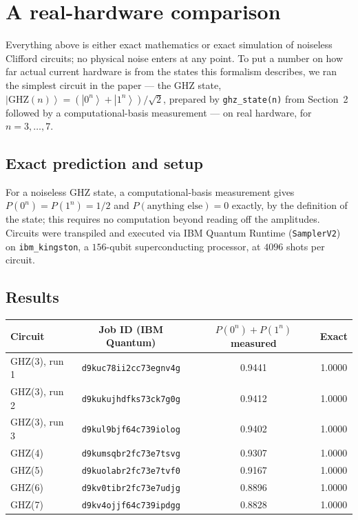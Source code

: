 \documentclass[11pt]{article}
\newcommand{\ket}[1]{\left|#1\right\rangle}
\begin{document}
\section{A real-hardware comparison}\label{sec:hardware}

Everything above is either exact mathematics or exact simulation of
noiseless Clifford circuits; no physical noise enters at any point. To
put a number on how far actual current hardware is from the states this
formalism describes, we ran the simplest circuit in the paper --- the
GHZ state, $\ket{\text{GHZ}(n)} = (\ket{0^n}+\ket{1^n})/\sqrt2$, prepared
by \texttt{ghz\_state(n)} from Section~2 followed by a computational-basis
measurement --- on real hardware, for $n=3,\ldots,7$.

\subsection{Exact prediction and setup}

For a noiseless GHZ state, a computational-basis measurement gives
$P(0^n) = P(1^n) = 1/2$ and $P(\text{anything else}) = 0$ exactly, by
the definition of the state; this requires no computation beyond reading
off the amplitudes. Circuits were transpiled and executed via IBM Quantum
Runtime (\texttt{SamplerV2}) on \texttt{ibm\_kingston}, a $156$-qubit
superconducting processor, at $4096$ shots per circuit.

\subsection{Results}

\begin{center}
\begin{tabular}{lccc}
Circuit & Job ID (IBM Quantum) & $P(0^n)+P(1^n)$ measured & Exact \\
\hline
GHZ(3), run 1 & \texttt{d9kuc78ii2cc73egnv4g} & 0.9441 & 1.0000 \\
GHZ(3), run 2 & \texttt{d9kukujhdfks73ck7g0g} & 0.9412 & 1.0000 \\
GHZ(3), run 3 & \texttt{d9kul9bjf64c739iolog} & 0.9402 & 1.0000 \\
GHZ(4) & \texttt{d9kumsqbr2fc73e7tsvg} & 0.9307 & 1.0000 \\
GHZ(5) & \texttt{d9kuolabr2fc73e7tvf0} & 0.9167 & 1.0000 \\
GHZ(6) & \texttt{d9kv0tibr2fc73e7udjg} & 0.8896 & 1.0000 \\
GHZ(7) & \texttt{d9kv4ojjf64c739ipdgg} & 0.8828 & 1.0000 \\
\end{tabular}
\end{center}
\end{document}
